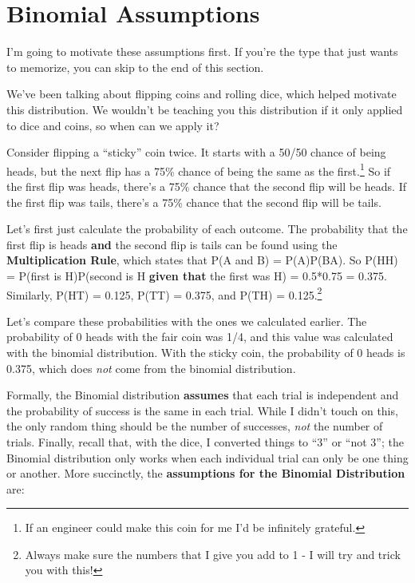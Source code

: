 \documentclass[
  letterpaper,
  DIV=11,
  numbers=noendperiod]{scrreprt}
\begin{document}
\hypertarget{binomial-assumptions}{%
\section{Binomial Assumptions}\label{binomial-assumptions}}

I'm going to motivate these assumptions first. If you're the type that
just wants to memorize, you can skip to the end of this section.

We've been talking about flipping coins and rolling dice, which helped
motivate this distribution. We wouldn't be teaching you this
distribution if it only applied to dice and coins, so when can we apply
it?

Consider flipping a ``sticky'' coin twice. It starts with a 50/50 chance
of being heads, but the next flip has a 75\% chance of being the same as
the first.\footnote{If an engineer could make this coin for me I'd be
  infinitely grateful.} So if the first flip was heads, there's a 75\%
chance that the second flip will be heads. If the first flip was tails,
there's a 75\% chance that the second flip will be tails.

Let's first just calculate the probability of each outcome. The
probability that the first flip is heads \textbf{and} the second flip is
tails can be found using the \textbf{Multiplication Rule}, which states
that P(A and B) = P(A)P(B\textbar A). So P(HH) = P(first is H)P(second
is H \textbf{given that} the first was H) = 0.5*0.75 = 0.375. Similarly,
P(HT) = 0.125, P(TT) = 0.375, and P(TH) = 0.125.\footnote{Always make
  sure the numbers that I give you add to 1 - I will try and trick you
  with this!}

Let's compare these probabilities with the ones we calculated earlier.
The probability of 0 heads with the fair coin was 1/4, and this value
was calculated with the binomial distribution. With the sticky coin, the
probability of 0 heads is 0.375, which does \emph{not} come from the
binomial distribution.

Formally, the Binomial distribution \textbf{assumes} that each trial is
independent and the probability of success is the same in each trial.
While I didn't touch on this, the only random thing should be the number
of successes, \emph{not} the number of trials. Finally, recall that,
with the dice, I converted things to ``3'' or ``not 3''; the Binomial
distribution only works when each individual trial can only be one thing
or another. More succinctly, the \textbf{assumptions for the Binomial
Distribution} are:
\end{document}
